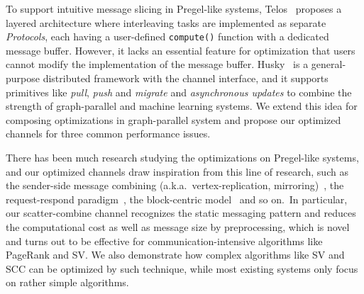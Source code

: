 \documentclass{sokendai_thesis} %
\begin{document}
To support intuitive message slicing in Pregel-like systems, Telos~\cite{telos} proposes a layered architecture where interleaving tasks are implemented as separate \emph{Protocols}, each having a user-defined \texttt{compute()} function with a dedicated message buffer.
However, it lacks an essential feature for optimization that users cannot modify the implementation of the message buffer.
Husky~\cite{husky} is a general-purpose distributed framework with the channel interface, and it supports primitives like \textit{pull}, \textit{push} and \textit{migrate} and \textit{asynchronous updates} to combine the strength of graph-parallel and machine learning systems.
We extend this idea for composing optimizations in graph-parallel system and propose our optimized channels for three common performance issues.

There has been much research studying the optimizations on Pregel-like systems, and our optimized channels draw inspiration from this line of research, such as the sender-side message combining (a.k.a.~vertex-replication, mirroring)~\cite{xpregel,gps,distrgraphlab,yan2015effective}, the request-respond paradigm~\cite{yan2015effective}, the block-centric model~\cite{thinkgraph,yan2014blogel,goffish} and so on.\
In particular, our scatter-combine channel recognizes the static messaging pattern and reduces the computational cost as well as message size by preprocessing, which is novel and turns out to be effective for com\-mu\-ni\-ca\-tion-intensive algorithms like PageRank and SV.
We also demonstrate how complex algorithms like SV and SCC can be optimized by such technique, while most existing systems only focus on rather simple algorithms.
\end{document}

